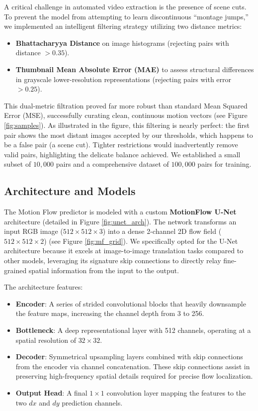 \documentclass[10pt,twocolumn,letterpaper]{article}
\begin{document}
A critical challenge in automated video extraction is the presence of scene cuts. To prevent the model from attempting to learn discontinuous ``montage jumps,'' we implemented an intelligent filtering strategy utilizing two distance metrics:
\begin{itemize}
    \item \textbf{Bhattacharyya Distance} on image histograms (rejecting pairs with distance $>0.35$).
    \item \textbf{Thumbnail Mean Absolute Error (MAE)} to assess structural differences in grayscale lower-resolution representations (rejecting pairs with error $>0.25$).
\end{itemize}
This dual-metric filtration proved far more robust than standard Mean Squared Error (MSE), successfully curating clean, continuous motion vectors (see Figure \ref{fig:samples}). As illustrated in the figure, this filtering is nearly perfect: the first pair shows the most distant images accepted by our thresholds, which happens to be a false pair (a scene cut). Tighter restrictions would inadvertently remove valid pairs, highlighting the delicate balance achieved. We established a small subset of $10,000$ pairs and a comprehensive dataset of $100,000$ pairs for training.

\subsection{Architecture and Models}

The Motion Flow predictor is modeled with a custom \textbf{MotionFlow U-Net} architecture (detailed in Figure \ref{fig:unet_arch}). The network transforms an input RGB image ($512 \times 512 \times 3$) into a dense 2-channel 2D flow field ($512 \times 512 \times 2$) (see Figure \ref{fig:mf_grid}). We specifically opted for the U-Net architecture because it excels at image-to-image translation tasks compared to other models, leveraging its signature skip connections to directly relay fine-grained spatial information from the input to the output.

The architecture features:
\begin{itemize}
    \item \textbf{Encoder}: A series of strided convolutional blocks that heavily downsample the feature maps, increasing the channel depth from 3 to 256.
    \item \textbf{Bottleneck}: A deep representational layer with 512 channels, operating at a spatial resolution of $32 \times 32$.
    \item \textbf{Decoder}: Symmetrical upsampling layers combined with skip connections from the encoder via channel concatenation. These skip connections assist in preserving high-frequency spatial details required for precise flow localization.
    \item \textbf{Output Head}: A final $1 \times 1$ convolution layer mapping the features to the two $dx$ and $dy$ prediction channels.
\end{itemize}
\end{document}
